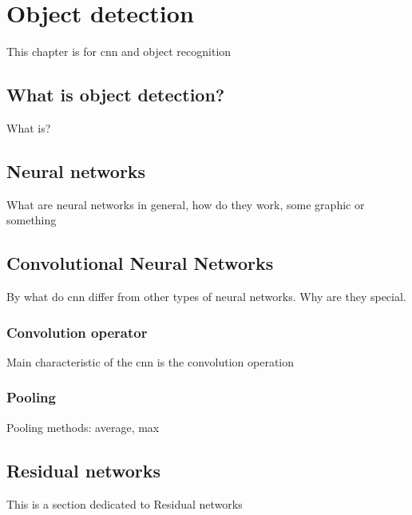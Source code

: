 \chapter{Object detection}
\label{chap:obj}

This chapter is for cnn and object recognition

\section{What is object detection?}
\label{sec:obj_what}

What is?

\section{Neural networks}
\label{sec:obj_nn}

What are neural networks in general, how do they work, some graphic or something

\section{Convolutional Neural Networks}
\label{sec:obj_cnn}

By what do cnn differ from other types of neural networks. Why are they special.

\subsection{Convolution operator}
\label{sec:obj_cnn_conv}

Main characteristic of the cnn is the convolution operation

\subsection{Pooling}
\label{sec:obj_cnn_pooling}

Pooling methods: average, max

\section{Residual networks}
\label{sec:obj_resnet}

This is a section dedicated to Residual networks \cite{resnet}